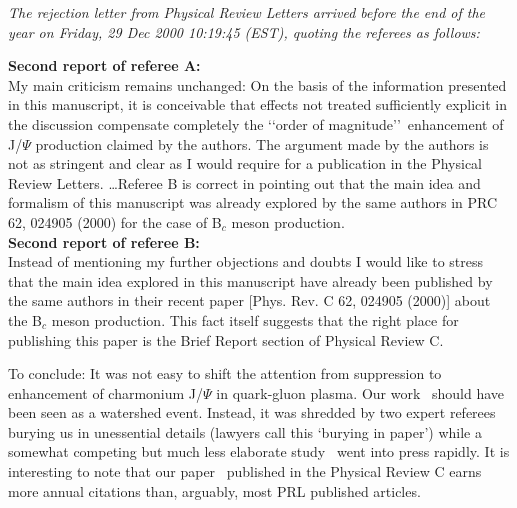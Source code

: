 \noindent \textit{The rejection letter from Physical Review Letters arrived before the end of the year on Friday, 29 Dec 2000 10:19:45 (EST), quoting the referees as follows:}\\[-0.7cm]
%
\begin{mdframed}[linecolor=gray,roundcorner=12pt,backgroundcolor=GreenYellow!15,linewidth=1pt,leftmargin=0cm,rightmargin=0cm,topline=true,bottomline=true,skipabove=12pt]\relax%
%
\textbf{Second report of referee A:}\\
\indent My main criticism remains unchanged: On the basis of the information presented in this manuscript, it is conceivable that effects not treated sufficiently explicit in the discussion compensate completely the \lq\lq order of magnitude\rq\rq\ enhancement of J/$\Psi$ production claimed by the authors. The argument made by the authors is not as stringent and clear as I would require for a publication in the Physical Review Letters. \ldots Referee B is correct in pointing out that the main idea and formalism of this manuscript was already explored by the same authors in PRC 62, 024905 (2000) for the case of B$_c$ meson production.\\

\noindent\textbf{Second report of referee B:}\\
\indent Instead of mentioning my further objections and doubts I would like to stress that the main idea explored in this manuscript have already been published by the same authors in their recent paper [Phys. Rev. C 62, 024905 (2000)] about the B$_c$ meson production. This fact itself suggests that the right place for publishing this paper is the Brief Report section of Physical Review C. 
\end{mdframed}
\vskip 0.5cm

To conclude: It was not easy to shift the attention from suppression to enhancement of charmonium J/$\Psi$ in quark-gluon plasma. Our work~\cite{Thews:2000rj} should have been seen as a watershed event. Instead, it was shredded by two expert referees burying us in unessential details (lawyers call this \lq burying in paper\rq) while a somewhat competing but much less elaborate study~\cite{BraunMunzinger:2000px} went into press rapidly. It is interesting to note that our paper~\cite{Thews:2000rj} published in the Physical Review C earns more annual citations than, arguably, most PRL published articles. 



